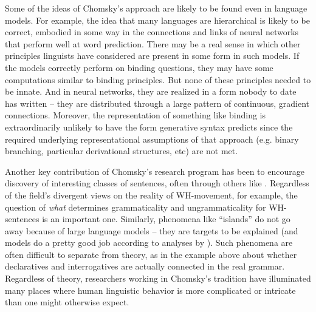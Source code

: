 \documentclass[output=paper,colorlinks,citecolor=brown]{langscibook}
\begin{document}
Some of the ideas of Chomsky's approach are likely to be found even in language models. For example, the idea that many languages are hierarchical is likely to be correct, embodied in some way in the connections and links of neural networks that perform well at word prediction.  There may be a real sense in which other principles linguists have considered are present in some form in such models. If the models correctly perform on binding questions, they may have some computations similar to binding principles. But none of these principles needed to be innate. And in neural networks, they are realized in a form nobody to date has written -- they are distributed through a large pattern of continuous, gradient connections. Moreover, the representation of something like binding is extraordinarily unlikely to have the form generative syntax predicts since the required underlying representational assumptions of that approach (e.g. binary branching, particular derivational structures, etc) are not met. 

Another key contribution of Chomsky's research program has been to encourage discovery of interesting classes of sentences, often through others like \citet{ross1967constraints}. Regardless of the field's divergent views on the reality of WH-movement, for example, the question of \textit{what} determines grammaticality and ungrammaticality for WH-sentences is an important one. Similarly,  phenomena like ``islands'' do not go away because of large language models -- they are targets to be explained (and models do a pretty good job according to analyses by \citealt{wilcox2022using}). Such phenomena are often difficult to separate from theory, as in the example above about whether declaratives and interrogatives are actually connected in the real grammar. Regardless of theory, researchers working in Chomsky's tradition have illuminated many places where human linguistic behavior is more complicated or intricate than one might otherwise expect.
\end{document}
